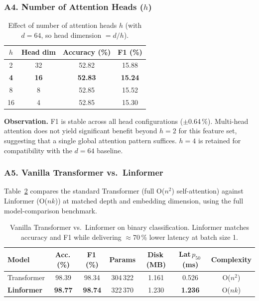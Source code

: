 \subsubsection{A4. Number of Attention Heads ($h$)}

\begin{table}[h]
\centering
\caption{Effect of number of attention heads $h$ (with $d=64$, so
head dimension $= d/h$).}
\label{tab:heads_sweep}
\begin{tabular}{cccc}
\toprule
$h$ & Head dim & Accuracy (\%) & F1 (\%) \\
\midrule
2  & 32 & 52.82 & 15.88 \\
\textbf{4}  & \textbf{16} & \textbf{52.83} & \textbf{15.24} \\
8  & 8  & 52.85 & 15.52 \\
16 & 4  & 52.85 & 15.30 \\
\bottomrule
\end{tabular}
\end{table}

\textbf{Observation.}
F1 is stable across all head configurations ($\pm$0.64\,\%).
Multi-head attention does not yield significant benefit beyond $h=2$ for this
feature set, suggesting that a single global attention pattern suffices.
$h=4$ is retained for compatibility with the $d=64$ baseline.

\subsubsection{A5. Vanilla Transformer vs.\ Linformer}

Table~\ref{tab:transformer_vs_linformer} compares the standard Transformer
(full O($n^2$) self-attention) against Linformer (O($nk$)) at matched depth
and embedding dimension, using the full model-comparison benchmark.

\begin{table}[h]
\centering
\caption{Vanilla Transformer vs.\ Linformer on binary classification.
Linformer matches accuracy and F1 while delivering $\approx$70\,\% lower
latency at batch size 1.}
\label{tab:transformer_vs_linformer}
\begin{tabular}{lcccccc}
\toprule
\textbf{Model} & \textbf{Acc.\,(\%)} & \textbf{F1\,(\%)} &
\textbf{Params} & \textbf{Disk\,(MB)} &
\textbf{Lat\,$p_{50}$\,(ms)} & \textbf{Complexity} \\
\midrule
Transformer & 98.39 & 98.34 & 304\,322 & 1.161 & 0.526 & O($n^2$) \\
\textbf{Linformer}   & \textbf{98.77} & \textbf{98.74} & 322\,370 & 1.230 & \textbf{1.236} & O($nk$) \\
\bottomrule
\end{tabular}
\end{table}

